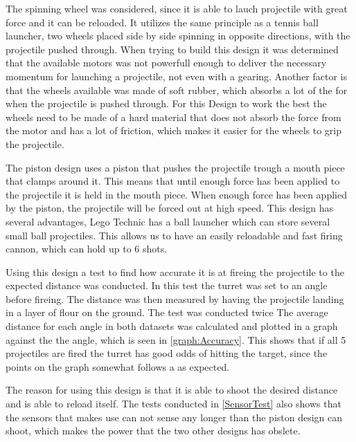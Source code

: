 The spinning wheel was considered, since it is able to lauch projectile with
great force and it can be reloaded. It utilizes the same principle as a tennis
ball launcher, two wheels placed side by side spinning in opposite directions, with the projectile pushed through.
When trying to build this design it was determined that the available motors was
not powerfull enough to deliver the necessary momentum for launching a
projectile, not even with a gearing. Another factor is that the wheels
available was made of soft rubber, which absorbs a lot of the for when the
projectile is pushed through. For this Design to work the best the wheels
need to be made of a hard material that does not absorb the force from the
motor and has a lot of friction, which makes it easier for the wheels to
grip the projectile.\nl

The piston design uses a piston that pushes the projectile
trough a mouth piece that clamps around it. This means that until enough force
has been applied to the projectile it is held in the mouth piece. When enough
force has been applied by the piston, the projectile will be forced out at high
speed.
This design has several advantages, Lego Technic has a ball launcher which can
store several small ball projectiles. This allows us to have an easily
reloadable and fast firing cannon, which can hold up to 6 shots.\nl

Using this design a test to find how accurate it is at fireing the projectile
to the expected distance was conducted.
In this test the turret was set to an angle before fireing. The distance was
then measured by having the projectile landing in a layer of flour on the
ground. The test was conducted twice The average distance for each angle in
both datasets was calculated and plotted in a graph against the the angle,
which is seen in \autoref{graph:Accuracy}. This shows that if all 5 projectiles
are fired the turret has good odds of hitting the target, since the points on
the graph somewhat follows a  as
expected.


The reason for using this design is that it is able to shoot the desired
distance and is able to reload itself. The tests conducted in
\autoref{SensorTest} also shows that the sensors that \name makes use can not
sense any longer than the piston design can shoot, which makes the power that
the two other designs has obslete.\nl

